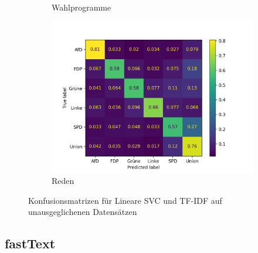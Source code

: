 \begin{figure}[H]
\begin{subfigure}{0.49\textwidth}
        \caption{Wahlprogramme}
        \label{sfig:confusionMatrixBaselineManifestUnbalanced}
    \end{subfigure}
    \hfill
    \begin{subfigure}{0.49\textwidth}
        \includegraphics[width=\textwidth]{data/images/modeling/baseline/none/speeches_confusion_matrix.png}
        \caption{Reden}
        \label{sfig:confusionMatrixBaselineSpeechesUnbalanced}
    \end{subfigure}
    \caption{Konfusionsmatrizen für Lineare \acs{SVC} und \acs{TF-IDF} auf unausgeglichenen Datensätzen} \label{fig:confusionMatrixBaselineUnbalanced}
\end{figure}

\subsection*{fastText}

